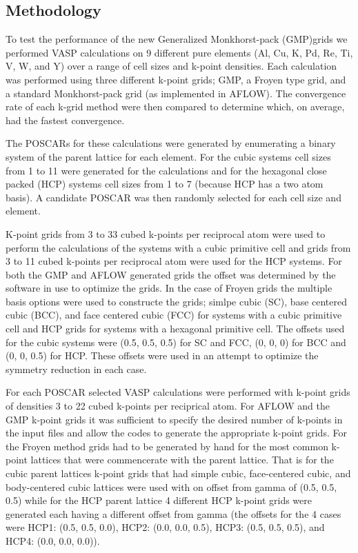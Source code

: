 \documentclass[12pt,prb,reprint]{revtex4-1}
\begin{document}
\subsection{Methodology} \label{Method}
To test the performance of the new Generalized Monkhorst-pack
(GMP)grids we performed VASP calculations on 9 different pure elements
(Al, Cu, K, Pd, Re, Ti, V, W, and Y) over a range of cell sizes and
k-point densities. Each calculation was performed using three
different k-point grids; GMP, a Froyen type grid, and a standard
Monkhorst-pack grid (as implemented in AFLOW). The convergence rate of
each k-grid method were then compared to determine which, on average,
had the fastest convergence.

The POSCARs for these calculations were generated by
enumerating\cite{enum3} a binary system of the parent lattice for each
element. For the cubic systems cell sizes from 1 to 11 were generated
for the calculations and for the hexagonal close packed (HCP) systems
cell sizes from 1 to 7 (because HCP has a two atom basis). A candidate
POSCAR was then randomly selected for each cell size and element.

K-point grids from 3 to 33 cubed k-points per reciprocal atom were
used to perform the calculations of the systems with a cubic primitive
cell and grids from 3 to 11 cubed k-points per reciprocal atom were
used for the HCP systems. For both the GMP and AFLOW generated grids
the offset was determined by the software in use to optimize the
grids. In the case of Froyen grids the multiple basis options were
used to constructe the grids; simlpe cubic (SC), base centered cubic
(BCC), and face centered cubic (FCC) for systems with a cubic
primitive cell and HCP grids for systems with a hexagonal primitive
cell. The offsets used for the cubic systems were (0.5, 0.5, 0.5) for
SC and FCC, (0, 0, 0) for BCC and (0, 0, 0.5) for HCP. These offsets
were used in an attempt to optimize the symmetry reduction in each
case.

For each POSCAR selected VASP calculations were performed with k-point
grids of densities 3 to 22 cubed k-points per reciprical atom. For
AFLOW and the GMP k-point grids it was sufficient to specify the
desired number of k-points in the input files and allow the codes to
generate the appropriate k-point grids. For the Froyen method grids
had to be generated by hand for the most common k-point lattices that
were commencerate with the parent lattice. That is for the cubic
parent lattices k-point grids that had simple cubic, face-centered
cubic, and body-centered cubic lattices were used with on offset from
gamma of (0.5, 0.5, 0.5) while for the HCP parent lattice 4 different
HCP k-point grids were generated each having a different offset from
gamma (the offsets for the 4 cases were HCP1: (0.5, 0.5, 0.0), HCP2:
(0.0, 0.0, 0.5), HCP3: (0.5, 0.5, 0.5), and HCP4: (0.0, 0.0, 0.0)).
\end{document}
